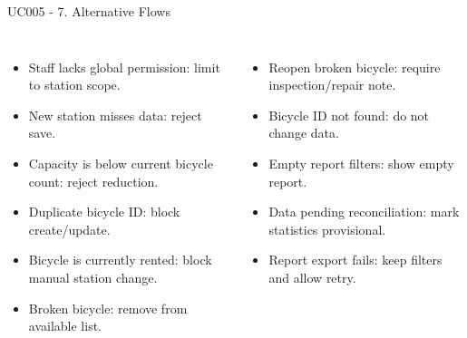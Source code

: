 \documentclass[aspectratio=169,10pt]{beamer}
\newcommand{\tightitems}{\setlength{\itemsep}{2pt}\setlength{\parskip}{0pt}}
\begin{document}
\begin{frame}{UC005 - 7. Alternative Flows}
\footnotesize
\begin{columns}[T,onlytextwidth]
\begin{itemize}\tightitems
  \item Staff lacks global permission: limit to station scope.
  \item New station misses data: reject save.
  \item Capacity is below current bicycle count: reject reduction.
  \item Duplicate bicycle ID: block create/update.
  \item Bicycle is currently rented: block manual station change.
  \item Broken bicycle: remove from available list.
\end{itemize}
\begin{itemize}\tightitems
  \item Reopen broken bicycle: require inspection/repair note.
  \item Bicycle ID not found: do not change data.
  \item Empty report filters: show empty report.
  \item Data pending reconciliation: mark statistics provisional.
  \item Report export fails: keep filters and allow retry.
\end{itemize}
\end{columns}
\end{frame}
\end{document}
